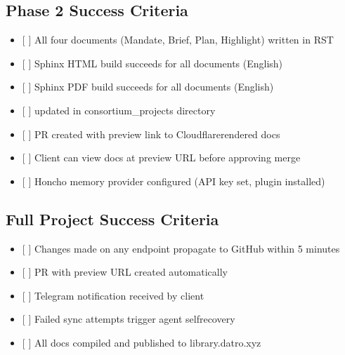 \documentclass[letterpaper,10pt,openany,oneside,english]{sphinxmanual}
\begin{document}
\subsection{Phase 2 Success Criteria}
\label{\detokenize{success_criteria:phase-2-success-criteria}}\begin{itemize}
\item {} 
\sphinxAtStartPar
{[} {]} All four documents (Mandate, Brief, Plan, Highlight) written in RST

\item {} 
\sphinxAtStartPar
{[} {]} Sphinx HTML build succeeds for all documents (English)

\item {} 
\sphinxAtStartPar
{[} {]} Sphinx PDF build succeeds for all documents (English)

\item {} 
\sphinxAtStartPar
{[} {]}  updated in consortium\_projects directory

\item {} 
\sphinxAtStartPar
{[} {]} PR created with preview link to Cloudflare\sphinxhyphen{}rendered docs

\item {} 
\sphinxAtStartPar
{[} {]} Client can view docs at preview URL before approving merge

\item {} 
\sphinxAtStartPar
{[} {]} Honcho memory provider configured (API key set, plugin installed)

\end{itemize}


\subsection{Full Project Success Criteria}
\label{\detokenize{success_criteria:full-project-success-criteria}}\begin{itemize}
\item {} 
\sphinxAtStartPar
{[} {]} Changes made on any endpoint propagate to GitHub within 5 minutes

\item {} 
\sphinxAtStartPar
{[} {]} PR with preview URL created automatically

\item {} 
\sphinxAtStartPar
{[} {]} Telegram notification received by client

\item {} 
\sphinxAtStartPar
{[} {]} Failed sync attempts trigger agent self\sphinxhyphen{}recovery

\item {} 
\sphinxAtStartPar
{[} {]} All docs compiled and published to library.datro.xyz

\end{itemize}
\end{document}
